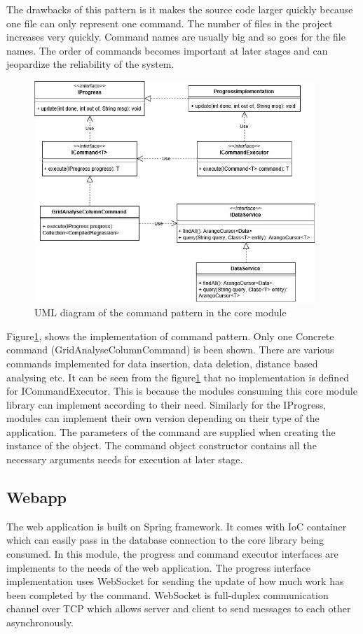 The drawbacks of this pattern is it makes the source code larger quickly because one file can only represent one command. The number of files in the project increases very quickly. Command names are usually big and so goes for the file names. The order of commands becomes important at later stages and can jeopardize the reliability of the system\cite{dupire2001command}.

\begin{figure}[!ht]
	\centering
	\includegraphics[width=300pt]{umlcore}
	\caption{\label{fig:umlcore} UML diagram of the command pattern in the core module}
\end{figure}

Figure\ref{fig:umlcore}, shows the implementation of command pattern. Only one Concrete command (GridAnalyseColumnCommand) is been shown. There are various commands implemented for data insertion, data deletion, distance based analysing etc. It can be seen from the figure\ref{fig:umlcore} that no implementation is defined for ICommandExecutor. This is because the modules consuming this core module library can implement according to their need. Similarly for the IProgress, modules can implement their own version depending on their type of the application. The parameters of the command are supplied when creating the instance of the object. The command object constructor contains all the necessary arguments needs for execution at later stage.

\subsection{Webapp}

The web application is built on Spring framework. It comes with IoC container which can easily pass in the database connection to the core library being consumed. In this module, the progress and command executor interfaces are implements to the needs of the web application. The progress interface implementation uses WebSocket for sending the update of how much work has been completed by the command. WebSocket is  full-duplex communication channel over TCP which allows server and client to send messages to each other asynchronously.

